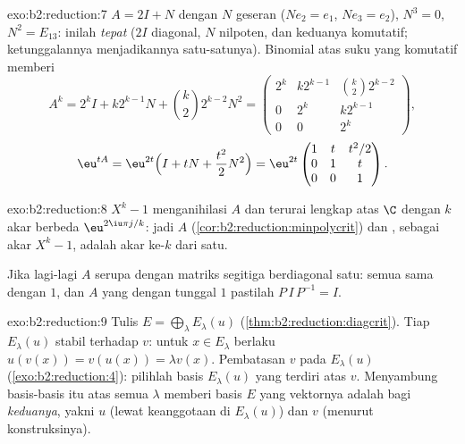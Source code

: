 \begin{solution}{exo:b2:reduction:7}
$A = 2I + N$ dengan $N$ geseran ($N e_2 = e_1$, $Ne_3 = e_2$),
$N^3 = 0$, $N^2 = E_{13}$: inilah \emph{tepat} 
($2I$ diagonal, $N$ nilpoten, dan keduanya komutatif; ketunggalannya
menjadikannya satu-satunya). Binomial atas suku yang komutatif memberi
\[
A^k = 2^k I + k 2^{k-1} N + \binom k2 2^{k-2} N^2
= \begin{pmatrix}
2^k & k2^{k-1} & \binom k2 2^{k-2}\\
0 & 2^k & k2^{k-1}\\
0 & 0 & 2^k
\end{pmatrix},
\]
\[
\eu^{tA} = \eu^{2t}\Bigl(I + tN + \frac{t^2}{2}N^2\Bigr)
= \eu^{2t}\begin{pmatrix}
1 & t & t^2/2\\
0 & 1 & t\\
0 & 0 & 1
\end{pmatrix}.
\]
\end{solution}

\begin{solution}{exo:b2:reduction:8}
$X^k - 1$ menganihilasi $A$ dan terurai lengkap atas $\C$ dengan $k$ akar
berbeda $\eu^{2\iu\pi j/k}$: jadi $A$ 
(\cref{cor:b2:reduction:minpolycrit}) dan , sebagai akar
$X^k - 1$, adalah akar ke-$k$ dari satu.

Jika lagi-lagi $A$ serupa dengan matriks segitiga berdiagonal
satu: semua  sama dengan $1$, dan $A$ yang  dengan  tunggal $1$ pastilah $P\,I\,P^{-1} = I$.
\end{solution}

\begin{solution}{exo:b2:reduction:9}
Tulis $E = \bigoplus_\lambda E_\lambda(u)$
(\cref{thm:b2:reduction:diagcrit}). Tiap $E_\lambda(u)$ stabil terhadap
$v$: untuk $x \in E_\lambda$ berlaku $u(v(x)) = v(u(x)) = \lambda
v(x)$. Pembatasan $v$ pada $E_\lambda(u)$ 
(\cref{exo:b2:reduction:4}): pilihlah basis $E_\lambda(u)$ yang terdiri
atas  $v$. Menyambung basis-basis itu atas semua $\lambda$
memberi basis $E$ yang vektornya adalah  bagi \emph{keduanya},
yakni $u$ (lewat keanggotaan di $E_\lambda(u)$) dan $v$ (menurut konstruksinya).
\end{solution}

